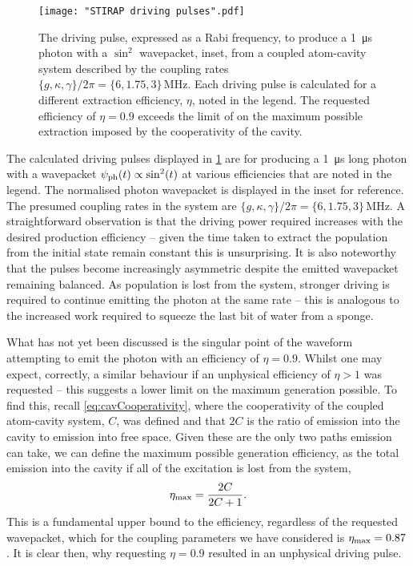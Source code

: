 \documentclass[../Thesis-IJspeert.tex]{subfiles}
\begin{document}
\begin{figure}[t]
	\center
	\texttt{[image: "STIRAP driving pulses".pdf]}
	\caption[Required driving pulses to produce a $\sin^{2}$ photon wavepacket with various efficiencies.]{The driving pulse, expressed as a Rabi frequency, to produce a \SI{1}{\us} photon with a $\sin^2$ wavepacket, inset, from a coupled atom-cavity system described by the coupling rates $\{g,\kappa,\gamma\}/2\pi = \{6,1.75,3\}\,\si{\MHz}$.  Each driving pulse is calculated for a different extraction efficiency, $\eta$, noted in the legend. The requested efficiency of $\eta=0.9$ exceeds the limit of on the maximum possible extraction imposed by the cooperativity of the cavity.}
	\label{fig:stirapDrivingPulses} 
\end{figure}

The calculated driving pulses displayed in \cref{fig:stirapDrivingPulses} are for producing a \SI{1}{\us} long photon with a wavepacket $\psi_{\mathrm{ph}}(t) \propto \sin^2(t)$ at various efficiencies that are noted in the legend.  The normalised photon wavepacket is displayed in the inset for reference.  The presumed coupling rates in the system are $\{g,\kappa,\gamma\}/2\pi = \{6,1.75,3\}\,\si{\MHz}$.  A straightforward observation is that the driving power required increases with the desired production efficiency -- given the time taken to extract the population from the initial state remain constant this is unsurprising.  It is also noteworthy that the pulses become increasingly asymmetric despite the emitted wavepacket remaining balanced.  As population is lost from the system, stronger driving is required to continue emitting the photon at the same rate -- this is analogous to the increased work required to squeeze the last bit of water from a sponge.

What has not yet been discussed is the singular point of the waveform attempting to emit the photon with an efficiency of $\eta=0.9$.  Whilst one may expect, correctly, a similar behaviour if an unphysical efficiency of $\eta > 1$ was requested -- this suggests a lower limit on the maximum generation possible.  To find this, recall \cref{eq:cavCooperativity}, where the cooperativity of the coupled atom-cavity system, $C$, was defined and that $2C$ is the ratio of emission into the cavity to emission into free space.  Given these are the only two paths emission can take, we can define the maximum possible generation efficiency, as the total emission into the cavity if all of the excitation is lost from the system,
\begin{equation}
	\eta_{\mathrm{max}} = \frac{2C}{2C+1}.
	\label{eq:striapMaxEff}
\end{equation}
This is a fundamental upper bound to the efficiency, regardless of the requested wavepacket, which for the coupling parameters we have considered is $\eta_{\mathrm{max}}=0.87$.  It is clear then, why requesting $\eta=0.9$ resulted in an unphysical driving pulse.
\end{document}

